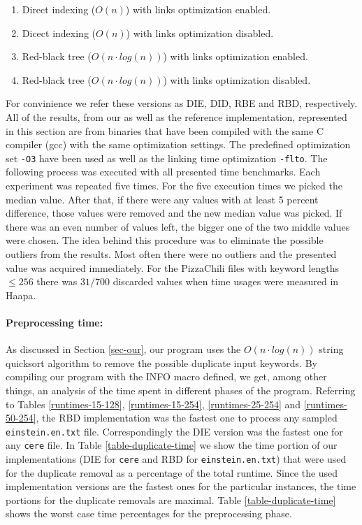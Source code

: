 \documentclass[english,twoside,censored,csm,algorithms-track-2020]{HYthesisML}
\theoremstyle{plain}
\theoremstyle{definition}
\begin{document}
\begin{enumerate}
\item Direct indexing ($O(n)$) with links optimization enabled.
\item Dicect indexing ($O(n)$) with links optimization disabled.
\item Red-black tree ($O(n\cdot log(n))$) with links optimization enabled.
\item Red-black tree ($O(n\cdot log(n))$) with links optimization disabled.
\end{enumerate}

For convinience we refer these versions as DIE, DID, RBE and RBD, respectively. All of the results,
from our as well as the reference implementation,
represented in this section are from binaries that have been compiled with the same C
compiler (gcc) with the same optimization settings. The predefined optimization set \texttt{-O3} have
been used as well as the linking time optimization \texttt{-flto}. The following process was executed
with all presented time benchmarks. Each experiment was repeated five times. For
the five execution times we picked the median value. After that, if there were any values with 
at least 5 percent difference, those values were removed and the new median value was picked.
If there was an even number of values left, the bigger one of the two middle values were chosen.
The idea behind this procedure was to eliminate the possible outliers from the results. Most often
there were no outliers and the presented value was acquired immediately. For the PizzaChili files
with keyword lengths $\leq 256$ there was $31/700$ discarded values when time usages were
measured in Haapa.

\paragraph{Preprocessing time:}
As discussed in Section \ref{sec-our}, our program uses the $O(n\cdot log(n))$ string quicksort
algorithm to remove the possible duplicate input keywords. By compiling our program with the
INFO macro defined, we get, among other things, an analysis of the time spent in different phases
of the program. Referring to Tables \ref{runtimes-15-128}, \ref{runtimes-15-254},
\ref{runtimes-25-254} and \ref{runtimes-50-254}, the RBD implementation was the fastest one
to process any sampled \texttt{einstein.en.txt}
file. Correspondingly the DIE version was the fastest one for any \texttt{cere} file. In Table
\ref{table-duplicate-time}
we show the time portion of our implementations (DIE for \texttt{cere} and RBD for
\texttt{einstein.en.txt}) that were
used for the duplicate removal as a percentage of the total runtime. Since the used  implementation
versions are the fastest ones for the particular instances, the time portions for the duplicate
removals are maximal. Table \ref{table-duplicate-time} shows the worst case time percentages
for the preprocessing phase.
\end{document}
